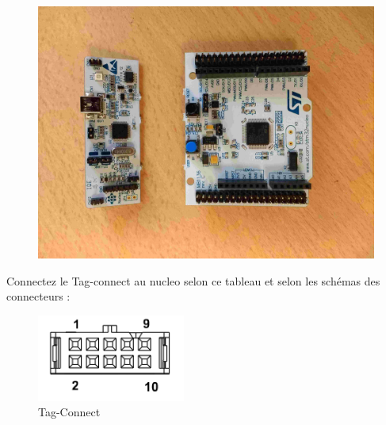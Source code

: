\documentclass{article}
\begin{document}
\begin{figure}[H]
\begin{center}
\advance\leftskip-3cm
\advance\rightskip-3cm
\includegraphics[keepaspectratio=true,scale=0.1]{nucleo_debug.jpg}
\label{visina8}
\end{center}\end{figure}






Connectez le Tag-connect au nucleo selon ce tableau et selon les schémas des connecteurs :



\begin{figure}[H]
\begin{center}
\advance\leftskip-3cm
\advance\rightskip-3cm
\includegraphics[keepaspectratio=true,scale=1]{tag_connectpinout.png}
\caption{Tag-Connect}
\label{visina8}
\end{center}\end{figure}
\end{document}

